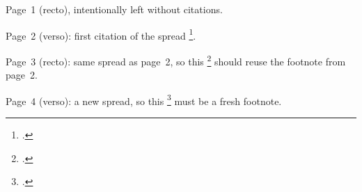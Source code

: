 \documentclass[twoside]{article}
\begin{document}
Page~1 (recto), intentionally left without citations.

\newpage
Page~2 (verso): first citation of the spread \footcite{A}.

\newpage
Page~3 (recto): same spread as page~2, so this \footcite{A} should reuse the
footnote from page~2.

\newpage
Page~4 (verso): a new spread, so this \footcite{A} must be a fresh footnote.
\end{document}
